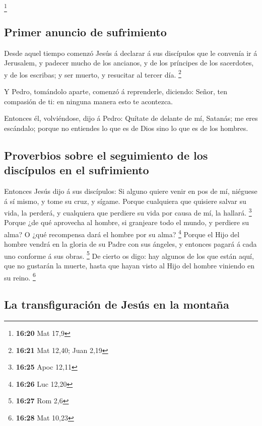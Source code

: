 \footnote{\textbf{16:20} Mat 17,9}

\hypertarget{primer-anuncio-de-sufrimiento}{%
\subsection{Primer anuncio de
sufrimiento}\label{primer-anuncio-de-sufrimiento}}

 Desde aquel tiempo comenzó Jesús á declarar á sus
discípulos que le convenía ir á Jerusalem, y padecer mucho de los
ancianos, y de los príncipes de los sacerdotes, y de los escribas; y ser
muerto, y resucitar al tercer día. \footnote{\textbf{16:21} Mat 12,40;
  Juan 2,19}

 Y Pedro, tomándolo aparte, comenzó á reprenderle,
diciendo: Señor, ten compasión de ti: en ninguna manera esto te
acontezca.

 Entonces él, volviéndose, dijo á Pedro: Quítate de delante
de mí, Satanás; me eres escándalo; porque no entiendes lo que es de Dios
sino lo que es de los hombres.

\hypertarget{proverbios-sobre-el-seguimiento-de-los-discuxedpulos-en-el-sufrimiento}{%
\subsection{Proverbios sobre el seguimiento de los discípulos en el
sufrimiento}\label{proverbios-sobre-el-seguimiento-de-los-discuxedpulos-en-el-sufrimiento}}

 Entonces Jesús dijo á sus discípulos: Si alguno quiere
venir en pos de mí, niéguese á sí mismo, y tome su cruz, y sígame.
 Porque cualquiera que quisiere salvar su vida, la perderá,
y cualquiera que perdiere su vida por causa de mí, la hallará.
\footnote{\textbf{16:25} Apoc 12,11}  Porque ¿de qué
aprovecha al hombre, si granjeare todo el mundo, y perdiere su alma? O
¿qué recompensa dará el hombre por su alma? \footnote{\textbf{16:26} Luc
  12,20}  Porque el Hijo del hombre vendrá en la gloria de
su Padre con sus ángeles, y entonces pagará á cada uno conforme á sus
obras. \footnote{\textbf{16:27} Rom 2,6}  De cierto os
digo: hay algunos de los que están aquí, que no gustarán la muerte,
hasta que hayan visto al Hijo del hombre viniendo en su reino.
\footnote{\textbf{16:28} Mat 10,23}

\hypertarget{la-transfiguraciuxf3n-de-jesuxfas-en-la-montauxf1a}{%
\subsection{La transfiguración de Jesús en la
montaña}\label{la-transfiguraciuxf3n-de-jesuxfas-en-la-montauxf1a}}

